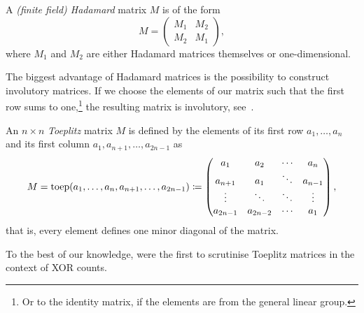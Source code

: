 \begin{definition}
    A \emph{(finite field) Hadamard} matrix $M$ is of the form
    \begin{equation*}
        M = \begin{pmatrix} M_1 & M_2 \\ M_2 & M_1 \end{pmatrix},
    \end{equation*}
    where $M_1$ and $M_2$ are either Hadamard matrices themselves or one-dimensional.
\end{definition}

The biggest advantage of Hadamard matrices is the possibility to construct involutory matrices.
If we choose the elements of our matrix such that the first row sums to one,\footnote{%
    Or to the identity matrix, if the elements are from the general linear group.
} the resulting matrix is involutory, see~\cite{AFRICACRYPT:GupRay13}.

\begin{definition}
    An $n \times n$ \emph{Toeplitz} matrix $M$ is defined by the elements of its first row $a_1, \ldots, a_n$ and its first column $a_1, a_{n+1}, \ldots, a_{2n-1}$ as
    \begin{equation*}
        M = \operatorname{toep}(a_1, \ldots, a_n, a_{n+1}, \ldots, a_{2n-1}) \coloneqq \begin{pmatrix}
            a_1      & a_2      & \cdots & a_n     \\
            a_{n+1}  & a_1      & \ddots & a_{n-1} \\
            \vdots   & \ddots   & \ddots & \vdots  \\
            a_{2n-1} & a_{2n-2} & \cdots & a_1     \\
        \end{pmatrix},
    \end{equation*}
    that is, every element defines one minor diagonal of the matrix.
\end{definition}

To the best of our knowledge, \textcite{ToSC:SarSye16} were the first to scrutinise Toeplitz matrices in the context of XOR counts.

